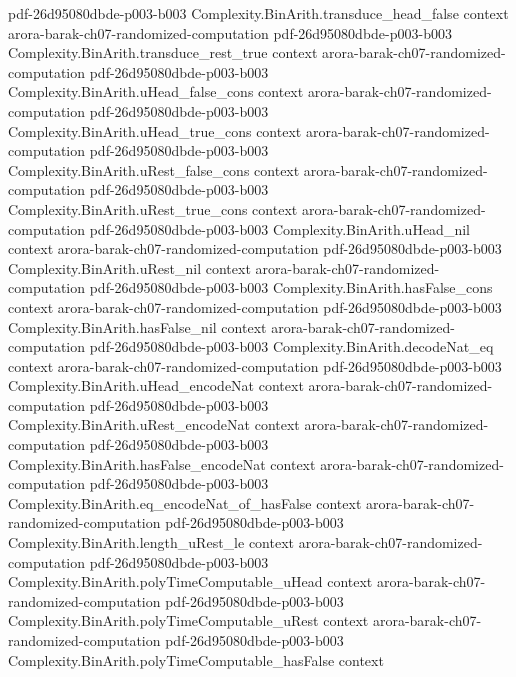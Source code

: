 \begin{theorem}
  {pdf-26d95080dbde-p003-b003}
\proofstep
  {Complexity.BinArith.transduce_head_false}
  {context}
  {arora-barak-ch07-randomized-computation}
  {pdf-26d95080dbde-p003-b003}
\proofstep
  {Complexity.BinArith.transduce_rest_true}
  {context}
  {arora-barak-ch07-randomized-computation}
  {pdf-26d95080dbde-p003-b003}
\proofstep
  {Complexity.BinArith.uHead_false_cons}
  {context}
  {arora-barak-ch07-randomized-computation}
  {pdf-26d95080dbde-p003-b003}
\proofstep
  {Complexity.BinArith.uHead_true_cons}
  {context}
  {arora-barak-ch07-randomized-computation}
  {pdf-26d95080dbde-p003-b003}
\proofstep
  {Complexity.BinArith.uRest_false_cons}
  {context}
  {arora-barak-ch07-randomized-computation}
  {pdf-26d95080dbde-p003-b003}
\proofstep
  {Complexity.BinArith.uRest_true_cons}
  {context}
  {arora-barak-ch07-randomized-computation}
  {pdf-26d95080dbde-p003-b003}
\proofstep
  {Complexity.BinArith.uHead_nil}
  {context}
  {arora-barak-ch07-randomized-computation}
  {pdf-26d95080dbde-p003-b003}
\proofstep
  {Complexity.BinArith.uRest_nil}
  {context}
  {arora-barak-ch07-randomized-computation}
  {pdf-26d95080dbde-p003-b003}
\proofstep
  {Complexity.BinArith.hasFalse_cons}
  {context}
  {arora-barak-ch07-randomized-computation}
  {pdf-26d95080dbde-p003-b003}
\proofstep
  {Complexity.BinArith.hasFalse_nil}
  {context}
  {arora-barak-ch07-randomized-computation}
  {pdf-26d95080dbde-p003-b003}
\proofstep
  {Complexity.BinArith.decodeNat_eq}
  {context}
  {arora-barak-ch07-randomized-computation}
  {pdf-26d95080dbde-p003-b003}
\proofstep
  {Complexity.BinArith.uHead_encodeNat}
  {context}
  {arora-barak-ch07-randomized-computation}
  {pdf-26d95080dbde-p003-b003}
\proofstep
  {Complexity.BinArith.uRest_encodeNat}
  {context}
  {arora-barak-ch07-randomized-computation}
  {pdf-26d95080dbde-p003-b003}
\proofstep
  {Complexity.BinArith.hasFalse_encodeNat}
  {context}
  {arora-barak-ch07-randomized-computation}
  {pdf-26d95080dbde-p003-b003}
\proofstep
  {Complexity.BinArith.eq_encodeNat_of_hasFalse}
  {context}
  {arora-barak-ch07-randomized-computation}
  {pdf-26d95080dbde-p003-b003}
\proofstep
  {Complexity.BinArith.length_uRest_le}
  {context}
  {arora-barak-ch07-randomized-computation}
  {pdf-26d95080dbde-p003-b003}
\proofstep
  {Complexity.BinArith.polyTimeComputable_uHead}
  {context}
  {arora-barak-ch07-randomized-computation}
  {pdf-26d95080dbde-p003-b003}
\proofstep
  {Complexity.BinArith.polyTimeComputable_uRest}
  {context}
  {arora-barak-ch07-randomized-computation}
  {pdf-26d95080dbde-p003-b003}
\proofstep
  {Complexity.BinArith.polyTimeComputable_hasFalse}
  {context}

\end{theorem}
